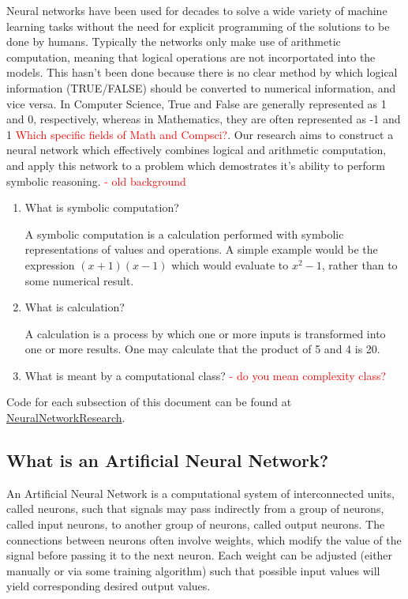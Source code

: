 \documentclass{article}
\begin{document}
	
	Neural networks have been used for decades to solve a wide variety of machine learning tasks without the need for explicit programming of the solutions to be done by humans. Typically the networks only make use of arithmetic computation, meaning that logical operations are not incorportated into the models. This hasn't been done because there is no clear method by which logical information (TRUE/FALSE) should be converted to numerical information, and vice versa. In Computer Science, True and False are generally represented as 1 and 0, respectively, whereas in Mathematics, they are often represented as -1 and 1 \textcolor{red}{Which specific fields of Math and Compsci?}. Our research aims to construct a neural network which effectively combines logical and arithmetic computation, and apply this network to a problem which demostrates it's ability to perform symbolic reasoning.
	\textcolor{red} {- old background} \\
	
	\begin{enumerate}
		\item What is symbolic computation?
		
		A symbolic computation is a calculation performed with symbolic representations of values and operations. A simple example would be the expression $(x + 1)(x - 1)$ which would evaluate to $x^2 - 1$, rather than to some numerical result.
		
		\item What is calculation?
		
		A calculation is a process by which one or more inputs is transformed into one or more results. One may calculate that the product of 5 and 4 is 20.
		
		\item What is meant by a computational class? \textcolor{red}{- do you mean complexity class?}
		
		
	\end{enumerate}
	
	Code for each subsection of this document can be found at \href{https://github.com/DariusBxsci/NeuralNetworkResearch/tree/master/NeuralNets}{NeuralNetworkResearch}. 
	
	\subsection{What is an Artificial Neural Network?}
	
		An Artificial Neural Network is a computational system of interconnected units, called neurons, such that signals may pass indirectly from a group of neurons, called input neurons, to another group of neurons, called output neurons. The connections between neurons often involve weights, which modify the value of the signal before passing it to the next neuron. Each weight can be adjusted (either manually or via some training algorithm) such that possible input values will yield corresponding desired output values.
	
\end{document}
